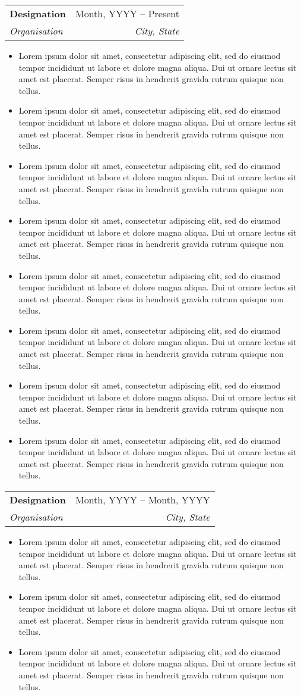 \documentclass[letterpaper, 11pt]{article}
\makeatletter
\newcommand{\resumeItem}[1]{ \item\small{ {#1 \vspace{-2pt}} } }
\newcommand{\resumeSubheading}[4]{
\vspace{1pt}
\item
\begin{tabular*}{0.97\textwidth}[t]{l@{\extracolsep{\fill}}r}
	\textbf{#1}       & #2                 \\
	\textit{\small#3} & \textit{\small #4} \\
\end{tabular*}
\vspace{-3pt}
}
\newcommand{\resumeItemListStart}{\begin{itemize}}
\newcommand{\resumeItemListEnd}{\end{itemize}
\vspace{-2pt}}
\makeatother
\begin{document}
\resumeSubheading {Designation}{Month, YYYY -- Present} {Organisation}{City, State}
\resumeItemListStart \resumeItem
{Lorem ipsum dolor sit amet, consectetur adipiscing elit, sed do eiusmod tempor incididunt ut labore et dolore magna aliqua. Dui ut ornare lectus sit amet est placerat. Semper risus in hendrerit gravida rutrum quisque non tellus.}
\resumeItem
{Lorem ipsum dolor sit amet, consectetur adipiscing elit, sed do eiusmod tempor incididunt ut labore et dolore magna aliqua. Dui ut ornare lectus sit amet est placerat. Semper risus in hendrerit gravida rutrum quisque non tellus.}
\resumeItem
{Lorem ipsum dolor sit amet, consectetur adipiscing elit, sed do eiusmod tempor incididunt ut labore et dolore magna aliqua. Dui ut ornare lectus sit amet est placerat. Semper risus in hendrerit gravida rutrum quisque non tellus.}
\resumeItem
{Lorem ipsum dolor sit amet, consectetur adipiscing elit, sed do eiusmod tempor incididunt ut labore et dolore magna aliqua. Dui ut ornare lectus sit amet est placerat. Semper risus in hendrerit gravida rutrum quisque non tellus.}
\resumeItem
{Lorem ipsum dolor sit amet, consectetur adipiscing elit, sed do eiusmod tempor incididunt ut labore et dolore magna aliqua. Dui ut ornare lectus sit amet est placerat. Semper risus in hendrerit gravida rutrum quisque non tellus.}
\resumeItem {Lorem ipsum dolor sit amet, consectetur adipiscing elit, sed do eiusmod tempor incididunt ut labore et dolore magna aliqua. Dui ut ornare lectus sit amet est placerat. Semper risus in hendrerit gravida rutrum quisque non tellus.}
\resumeItem
{Lorem ipsum dolor sit amet, consectetur adipiscing elit, sed do eiusmod tempor incididunt ut labore et dolore magna aliqua. Dui ut ornare lectus sit amet est placerat. Semper risus in hendrerit gravida rutrum quisque non tellus.}
\resumeItem
{Lorem ipsum dolor sit amet, consectetur adipiscing elit, sed do eiusmod tempor incididunt ut labore et dolore magna aliqua. Dui ut ornare lectus sit amet est placerat. Semper risus in hendrerit gravida rutrum quisque non tellus.}
\resumeItemListEnd

\resumeSubheading {Designation}{Month, YYYY -- Month, YYYY}
{Organisation}{City, State} \resumeItemListStart \resumeItem {Lorem ipsum dolor sit amet, consectetur adipiscing elit, sed do eiusmod tempor incididunt ut labore et dolore magna aliqua. Dui ut ornare lectus sit amet est placerat. Semper risus in hendrerit gravida rutrum quisque non tellus.}
\resumeItem {Lorem ipsum dolor sit amet, consectetur adipiscing elit, sed do eiusmod tempor incididunt ut labore et dolore magna aliqua. Dui ut ornare lectus sit amet est placerat. Semper risus in hendrerit gravida rutrum quisque non tellus.} \resumeItem {Lorem ipsum dolor sit amet, consectetur adipiscing elit, sed do eiusmod tempor incididunt ut labore et dolore magna aliqua. Dui ut ornare lectus sit amet est placerat. Semper risus in hendrerit gravida rutrum quisque non tellus.}
\resumeItemListEnd
\end{document}
